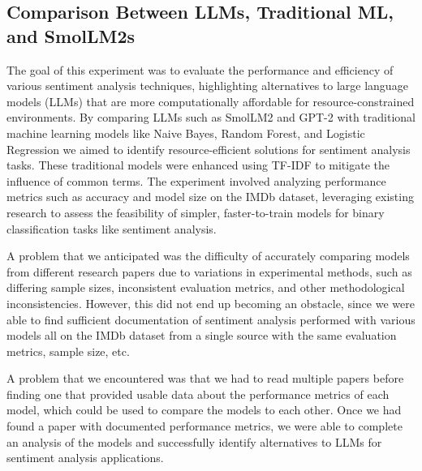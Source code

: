 \documentclass[10pt,twocolumn,letterpaper]{article}
\begin{document}


\subsection{Comparison Between LLMs, Traditional ML, and SmolLM2s}
The goal of this experiment was to evaluate the performance and efficiency of various sentiment analysis techniques, highlighting alternatives to large language models (LLMs) that are more computationally affordable for resource-constrained environments. By comparing LLMs such as SmolLM2 and GPT-2 with traditional machine learning models like Naive Bayes, Random Forest, and Logistic Regression we aimed to identify resource-efficient solutions for sentiment analysis tasks. These traditional models were enhanced using TF-IDF to mitigate the influence of common terms. The experiment involved analyzing performance metrics such as accuracy and model size on the IMDb dataset, leveraging existing research to assess the feasibility of simpler, faster-to-train models for binary classification tasks like sentiment analysis.

A problem that we anticipated was the difficulty of accurately comparing models from different research papers due to variations in experimental methods, such as differing sample sizes, inconsistent evaluation metrics, and other methodological inconsistencies. However, this did not end up becoming an obstacle, since we were able to find sufficient documentation of sentiment analysis performed with various models all on the IMDb dataset from a single source with the same evaluation metrics, sample size, etc.

A problem that we encountered was that we had to read multiple papers before finding one that provided usable data about the performance metrics of each model, which could be used to compare the models to each other. Once we had found a paper with documented performance metrics, we were able to complete an analysis of the models and successfully identify alternatives to LLMs for sentiment analysis applications.
\end{document}
